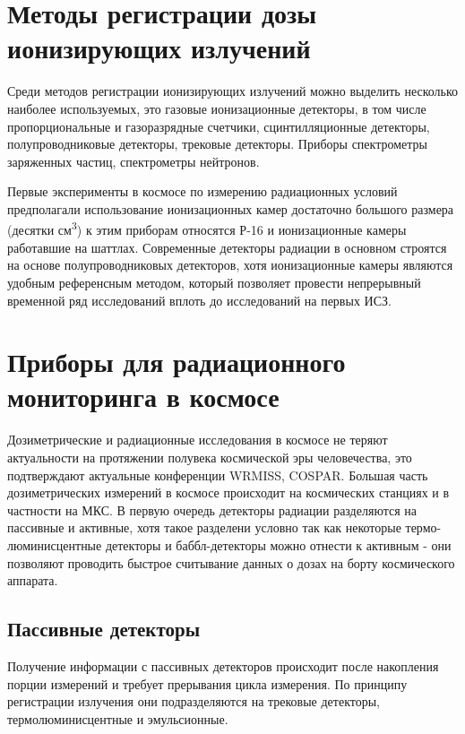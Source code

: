 \section{Методы регистрации дозы ионизирующих излучений} \label{sect1_2}

Среди методов регистрации ионизирующих излучений можно выделить несколько наиболее используемых, это газовые ионизационные детекторы, в том числе пропорциональные и газоразрядные счетчики, сцинтилляционные детекторы, полупроводниковые детекторы, трековые детекторы. Приборы спектрометры заряженных частиц, спектрометры нейтронов.

Первые эксперименты в космосе по измерению радиационных условий предполагали использование ионизационных камер достаточно большого размера (десятки см\textsuperscript{3}) к этим приборам относятся Р-16 и ионизационные камеры работавшие на шаттлах\cite{Dorman2004}. Современные детекторы радиации в основном строятся на основе полупроводниковых детекторов, хотя ионизационные камеры являются удобным референсным методом, который позволяет провести непрерывный временной ряд исследований вплоть до исследований на первых ИСЗ.


\section{Приборы для радиационного мониторинга в космосе} \label{sect1_3}

Дозиметрические и радиационные исследования в космосе не теряют актуальности на протяжении полувека космической эры человечества, это подтверждают актуальные  конференции WRMISS, COSPAR. Большая часть дозиметрических измерений в космосе происходит на космических станциях и в частности на МКС. 
В первую очередь детекторы радиации разделяются на пассивные и активные, хотя такое разделени условно так как некоторые термо-люминисцентные детекторы и баббл-детекторы можно отнести к активным - они позволяют проводить быстрое считывание данных о дозах на борту космического аппарата. 

\subsection{Пассивные детекторы} \label{subsect1_3_1}

Получение информации с пассивных детекторов происходит после накопления порции измерений и требует прерывания цикла измерения. По принципу регистрации излучения они подразделяются на трековые детекторы, термолюминисцентные и эмульсионные.


